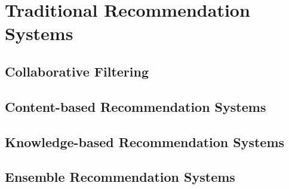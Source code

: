 %
%
%
\chapter{Traditional Recommendation Systems}
\label{intro} %

\section{Collaborative Filtering}

\section{Content-based Recommendation Systems}

\section{Knowledge-based Recommendation Systems}

\section{Ensemble Recommendation Systems}


